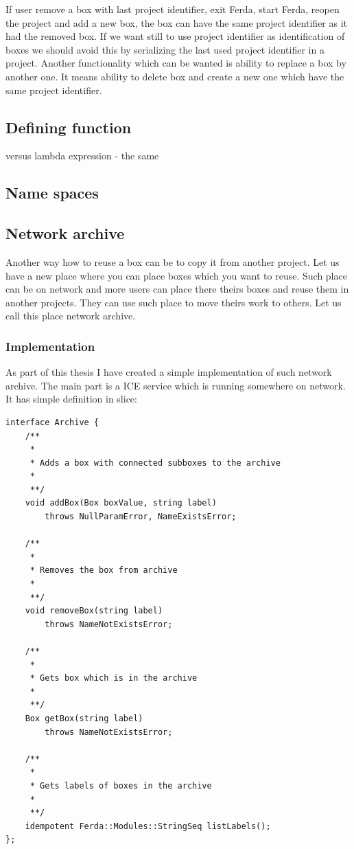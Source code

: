 \documentclass[a4paper,12pt]{book}
\begin{document}
If user remove a box with last project identifier, exit Ferda, start Ferda, reopen the project and add a new box, the box can have the same project identifier as it had the removed box. If we want still to use project identifier as identification of boxes we should avoid this by serializing the last used project identifier in a project. Another functionality which can be wanted is ability to replace a box by another one. It means ability to delete box and create a new one which have the same project identifier.

\subsection{Defining function}
versus lambda expression - the same
\subsection{Name spaces}
\subsection{Network archive}
Another way how to reuse a box can be to copy it from another project. Let us have a new place where you can place boxes which you want to reuse. Such place can be on network and more users can place there theirs boxes and reuse them in another projects. They can use such place to move theirs work to others. Let us call this place network archive.

\subsubsection{Implementation}
As part of this thesis I have created a simple implementation of such network archive. The main part is a ICE service which is running somewhere on network. It has simple definition in slice:
\begin{verbatim}
interface Archive {
	/**
	 *
	 * Adds a box with connected subboxes to the archive
	 *
	 **/
	void addBox(Box boxValue, string label)
		throws NullParamError, NameExistsError;

	/**
	 *
	 * Removes the box from archive
	 *
	 **/
	void removeBox(string label)
		throws NameNotExistsError;

	/**
	 *
	 * Gets box which is in the archive
	 *
	 **/
	Box getBox(string label)
		throws NameNotExistsError;

	/**
	 *
	 * Gets labels of boxes in the archive
	 *
	 **/
	idempotent Ferda::Modules::StringSeq listLabels();
};
\end{verbatim}
\end{document}
